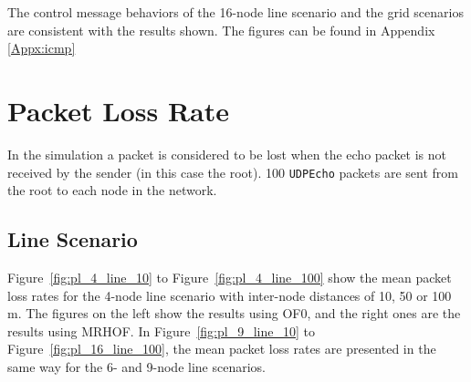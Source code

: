The control message behaviors of the 16-node line scenario and the grid scenarios are consistent with the results shown. The figures can be found in Appendix \ref{Appx:icmp}

\clearpage
\section{Packet Loss Rate}
\label{pl}

In the simulation a packet is considered to be lost when the echo packet is not received by the sender (in this case the root). 100 \texttt{UDPEcho} packets are sent from the root to each node in the network.

\subsection{Line Scenario}
\label{pl:line}

Figure~\ref{fig:pl_4_line_10} to Figure~\ref{fig:pl_4_line_100} show the mean packet loss rates for the 4-node line scenario with inter-node distances of 10, 50 or 100 m. The figures on the left show the results using OF0, and the right ones are the results using MRHOF. In Figure~\ref{fig:pl_9_line_10} to Figure~\ref{fig:pl_16_line_100}, the mean packet loss rates are presented in the same way for the 6- and 9-node line scenarios.

